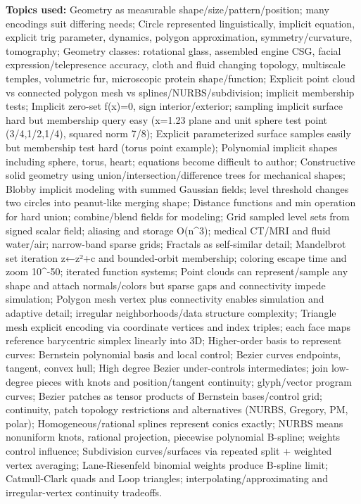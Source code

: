 \textbf{Topics used:} Geometry as measurable shape/size/pattern/position; many encodings suit differing needs; Circle represented linguistically, implicit equation, explicit trig parameter, dynamics, polygon approximation, symmetry/curvature, tomography; Geometry classes: rotational glass, assembled engine CSG, facial expression/telepresence accuracy, cloth and fluid changing topology, multiscale temples, volumetric fur, microscopic protein shape/function; Explicit point cloud vs connected polygon mesh vs splines/NURBS/subdivision; implicit membership tests; Implicit zero-set f(x)=0, sign interior/exterior; sampling implicit surface hard but membership query easy (x=1.23 plane and unit sphere test point (3/4,1/2,1/4), squared norm 7/8); Explicit parameterized surface samples easily but membership test hard (torus point example); Polynomial implicit shapes including sphere, torus, heart; equations become difficult to author; Constructive solid geometry using union/intersection/difference trees for mechanical shapes; Blobby implicit modeling with summed Gaussian fields; level threshold changes two circles into peanut-like merging shape; Distance functions and min operation for hard union; combine/blend fields for modeling; Grid sampled level sets from signed scalar field; aliasing and storage O(n\^{}3); medical CT/MRI and fluid water/air; narrow-band sparse grids; Fractals as self-similar detail; Mandelbrot set iteration z←z²+c and bounded-orbit membership; coloring escape time and zoom 10\^{}-50; iterated function systems; Point clouds can represent/sample any shape and attach normals/colors but sparse gaps and connectivity impede simulation; Polygon mesh vertex plus connectivity enables simulation and adaptive detail; irregular neighborhoods/data structure complexity; Triangle mesh explicit encoding via coordinate vertices and index triples; each face maps reference barycentric simplex linearly into 3D; Higher-order basis to represent curves: Bernstein polynomial basis and local control; Bezier curves endpoints, tangent, convex hull; High degree Bezier under-controls intermediates; join low-degree pieces with knots and position/tangent continuity; glyph/vector program curves; Bezier patches as tensor products of Bernstein bases/control grid; continuity, patch topology restrictions and alternatives (NURBS, Gregory, PM, polar); Homogeneous/rational splines represent conics exactly; NURBS means nonuniform knots, rational projection, piecewise polynomial B-spline; weights control influence; Subdivision curves/surfaces via repeated split + weighted vertex averaging; Lane-Riesenfeld binomial weights produce B-spline limit; Catmull-Clark quads and Loop triangles; interpolating/approximating and irregular-vertex continuity tradeoffs.

